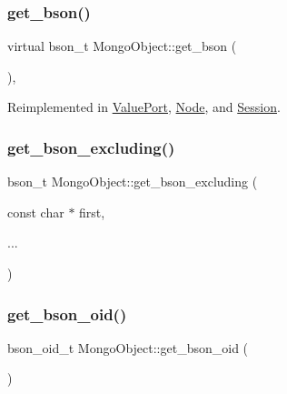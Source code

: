 \mbox{\label{class_mongo_object_ac21cbe104a818f7e6ee7dcfbb521e9e1}} 
\subsubsection{\texorpdfstring{get\+\_\+bson()}{get\_bson()}}
{\footnotesize\ttfamily virtual bson\+\_\+t Mongo\+Object\+::get\+\_\+bson (\begin{DoxyParamCaption}{ }\end{DoxyParamCaption})\hspace{0.3cm}{\ttfamily [protected]}, {\ttfamily [virtual]}}



Reimplemented in \hyperlink{class_value_port_a9b241081b386fe6de942ffce150b7eda}{Value\+Port}, \hyperlink{class_node_a9568e1bba3436d78e77862902e328592}{Node}, and \hyperlink{class_session_aa517fe6138a0cc32e27ddf1eb7331520}{Session}.

\mbox{\label{class_mongo_object_ac35c66d91e7297eb46313b98d01751cb}} 
\subsubsection{\texorpdfstring{get\+\_\+bson\+\_\+excluding()}{get\_bson\_excluding()}}
{\footnotesize\ttfamily bson\+\_\+t Mongo\+Object\+::get\+\_\+bson\+\_\+excluding (\begin{DoxyParamCaption}\item[{const char $\ast$}]{first,  }\item[{}]{... }\end{DoxyParamCaption})\hspace{0.3cm}{\ttfamily [protected]}}

\mbox{\label{class_mongo_object_aaca278b427d042a63caf2962b5e76043}} 
\subsubsection{\texorpdfstring{get\+\_\+bson\+\_\+oid()}{get\_bson\_oid()}}
{\footnotesize\ttfamily bson\+\_\+oid\+\_\+t Mongo\+Object\+::get\+\_\+bson\+\_\+oid (\begin{DoxyParamCaption}{ }\end{DoxyParamCaption})\hspace{0.3cm}{\ttfamily [protected]}}

